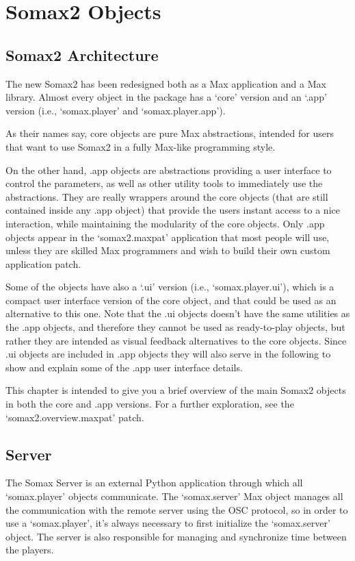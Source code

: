 \chapter{Somax2 Objects}\label{sec:objects}

\section{Somax2 Architecture}
The new Somax2 has been redesigned both as a Max application and a Max library. Almost every object in the package has a `core' version and an `.app' version (i.e., `somax.player' and `somax.player.app'). 

As their names say, core objects are pure Max abstractions, intended for users that want to use Somax2 in a fully Max-like programming style. 

On the other hand, .app objects are abstractions providing a user interface to control the parameters, as well as other utility tools to immediately use the abstractions. They are really wrappers around the core objects (that are still contained inside any .app object) that provide the users instant access to a nice interaction, while maintaining the modularity of the core objects. 
Only .app objects appear in the `somax2.maxpat' application that most people will use, unless they are skilled Max programmers and wish to build their own custom application patch.

Some of the objects have also a `.ui' version (i.e., `somax.player.ui'), which is a compact user interface version of the core object, and that could be used as an alternative to this one. Note that the .ui objects doesn't have the same utilities as the .app objects, and therefore they cannot be used as ready-to-play objects, but rather they are intended as visual feedback alternatives to the core objects. Since .ui objects are included in .app objects they will also serve in the following to show and explain some of the .app user interface details.

This chapter is intended to give you a brief overview of the main Somax2 objects in both the core and .app versions. For a further exploration, see the `somax2.overview.maxpat' patch.



\section{Server}

The Somax Server is an external Python application through which all `somax.player' objects communicate. The `somax.server' Max object manages all the communication with the remote server using the OSC protocol, so in order to use a `somax.player', it's always necessary to first initialize the `somax.server' object. The server is also responsible for managing and synchronize time between the players. 

